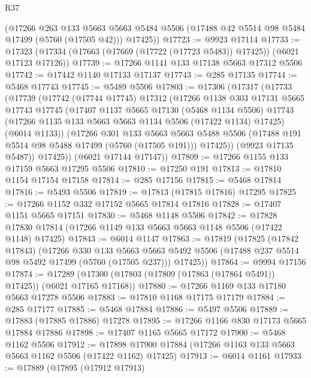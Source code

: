 \begin{lexlean}{R37}
\begin{coremodule}
      (@17266
        @263
        @133
        @5663
        @5663
        @5484
        @5506
        (@17488 @42 @5514 @98 @5484 @17499 (@5760 (@17505 @42)))
        @17425))
@17723 := @9923 @17114
@17733 := @17323 (@17334 (@17663 (@17669 (@17722 (@17723 @5483)) @17425)) (@6021 @17123 @17126))
@17739 := @17266 @1141 @133 @17138 @5663 @17312 @5506
@17742 := @17442 @1140 @17133 @17137
@17743 := @285 @17135
@17744 := @5468 @17743
@17745 := @5489 @5506
@17803 := @17306
    (@17317
      (@17733
        (@17739
          (@17742
            (@17744 @17745)
            @17312
            (@17266
              @1138
              @303
              @17131
              @5665
              @17743
              @17745
              (@17407
                @1137
                @5665
                @17130
                (@5468 @1134 @5506)
                @17743
                (@17266 @1135 @133 @5663 @5663 @1134 @5506 (@17422 @1134) @17425)
                (@6014 @1133))
              (@17266
                @301
                @133
                @5663
                @5663
                @5488
                @5506
                (@17488 @191 @5514 @98 @5488 @17499 (@5760 (@17505 @191)))
                @17425))
            (@9923 @17135 @5487))
          @17425))
      (@6021 @17144 @17147))
@17809 := @17266 @1155 @133 @17159 @5663 @17295 @5506
@17810 := @17250 @191
@17813 := @17810 @1154 @17154 @17158
@17814 := @285 @17156
@17815 := @5468 @17814
@17816 := @5493 @5506
@17819 := @17813 (@17815 @17816) @17295
@17825 := @17266 @1152 @332 @17152 @5665 @17814 @17816
@17828 := @17407 @1151 @5665 @17151
@17830 := @5468 @1148 @5506
@17842 := @17828 @17830 @17814 (@17266 @1149 @133 @5663 @5663 @1148 @5506 (@17422 @1148) @17425)
@17843 := @6014 @1147
@17863 := @17819
    (@17825
      (@17842 @17843)
      (@17266
        @330
        @133
        @5663
        @5663
        @5492
        @5506
        (@17488 @237 @5514 @98 @5492 @17499 (@5760 (@17505 @237)))
        @17425))
@17864 := @9994 @17156
@17874 := @17289 (@17300 (@17803 (@17809 (@17863 (@17864 @5491)) @17425)) (@6021 @17165 @17168))
@17880 := @17266 @1169 @133 @17180 @5663 @17278 @5506
@17883 := @17810 @1168 @17175 @17179
@17884 := @285 @17177
@17885 := @5468 @17884
@17886 := @5497 @5506
@17889 := @17883 (@17885 @17886) @17278
@17895 := @17266 @1166 @830 @17173 @5665 @17884 @17886
@17898 := @17407 @1165 @5665 @17172
@17900 := @5468 @1162 @5506
@17912 := @17898 @17900 @17884 (@17266 @1163 @133 @5663 @5663 @1162 @5506 (@17422 @1162) @17425)
@17913 := @6014 @1161
@17933 := @17889
    (@17895
      (@17912 @17913)

\end{coremodule}
\end{lexlean}
